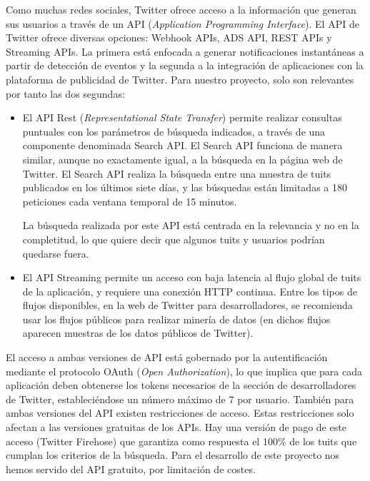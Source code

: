 Como muchas redes sociales, Twitter ofrece acceso a la información que generan sus usuarios a través de un
API ({\em Application Programming Interface})\cite{twitter_dev_web}. El API de Twitter ofrece diversas opciones: 
Webhook APIs, ADS API, REST APIs y Streaming APIs. La primera está enfocada a generar  
notificaciones instantáneas a partir de detección de eventos y la segunda a la integración de aplicaciones con la 
plataforma de publicidad de Twitter. Para nuestro proyecto, solo son relevantes por tanto las dos segundas:
\begin{itemize}
\item El API Rest ({\em Representational State Transfer}) permite realizar consultas puntuales con los parámetros de búsqueda indicados,
a través de una componente denominada Search API. El Search API funciona de manera similar, aunque no 
exactamente igual, a la búsqueda en la página web de Twitter. El Search API 
realiza la búsqueda entre una muestra de tuits publicados en los últimos siete días, y
las búsquedas están limitadas a 180 peticiones cada ventana temporal de 15 minutos. 


La búsqueda realizada por este API está centrada en la relevancia y no en la completitud, lo que 
quiere decir que algunos tuits y usuarios podrían quedarse fuera.

\item El API Streaming permite un acceso con baja latencia al flujo global de tuits de la aplicación,
y requiere una conexión HTTP continua. Entre los tipos de flujos disponibles, en la web de Twitter
para desarrolladores, se recomienda usar los flujos públicos para realizar minería de datos (en dichos flujos
aparecen muestras de los datos públicos de Twitter).


\end{itemize}

El acceso a ambas versiones de API está gobernado por la autentificación mediante el protocolo OAuth
({\em Open Authorization}), lo que implica que para cada aplicación deben obtenerse los tokens necesarios 
de la sección de desarrolladores de Twitter, estableciéndose un número máximo de 7 por usuario.
También para ambas versiones del API existen restricciones de acceso. Estas restricciones solo
afectan a las versiones gratuitas de los APIs. Hay una versión de pago de este acceso  (Twitter Firehose)
que garantiza como respuesta el 100\% de los tuits que cumplan los criterios de la búsqueda.
Para el desarrollo de este proyecto nos hemos servido del API gratuito, por limitación de costes. 


